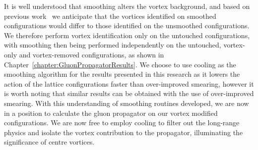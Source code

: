 It is well understood that smoothing alters the vortex background, and based on previous work~\cite{Cais:2008za,Trewartha:2015ida,DelDebbio:1998luz} we anticipate that the vortices identified on smoothed configurations would differ to those identified on the unsmoothed configurations. We therefore perform vortex identification only on the untouched configurations, with smoothing then being performed independently on the untouched, vortex-only and vortex-removed configurations, as shown in Chapter~\ref{chapter:GluonPropagatorResults}. We choose to use cooling as the smoothing algorithm for the results presented in this research as it lowers the action of the lattice configurations faster than over-improved smearing, however it is worth noting that similar results can be obtained with the use of over-improved smearing. With this understanding of smoothing routines developed, we are now in a position to calculate the gluon propagator on our vortex modified configurations. We are now free to employ cooling to filter out the long-range physics and isolate the vortex contribution to the propagator, illuminating the significance of centre vortices. 

